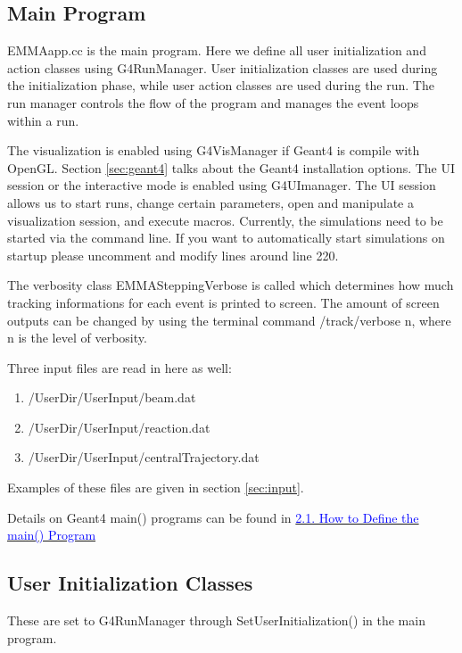 \documentclass[letter,12pt]{article}
\newcommand{\filefont}[1]{{\fontfamily{pnc}\selectfont #1}\xspace}
\newcommand{\hrefcolor}[2]{\href{#1}{\textcolor{blue}{#2}}\xspace}
\begin{document}
\subsection{Main Program}

\filefont{EMMAapp.cc} is the main program. Here we define all user initialization and action classes using \filefont{G4RunManager}. User initialization classes are used during the initialization phase, while user action classes are used during the run. The run manager controls the flow of the program and manages the event loops within a run. 

The visualization is enabled using \filefont{G4VisManager} if Geant4 is compile with OpenGL. Section \ref{sec:geant4} talks about the Geant4 installation options. The UI session or the interactive mode is enabled using \filefont{G4UImanager}. The UI session allows us to start runs, change certain parameters, open and manipulate a visualization session, and execute macros. Currently, the simulations need to be started via the command line. If you want to automatically start simulations on startup please uncomment and modify lines around line 220.

The verbosity class \filefont{EMMASteppingVerbose} is called which determines how much tracking informations for each event is printed to screen. The amount of screen outputs can be changed by using the terminal command \filefont{/track/verbose n}, where n is the level of verbosity.

Three input files are read in here as well:
\begin{enumerate}
\item \filefont{/UserDir/UserInput/beam.dat}
\item \filefont{/UserDir/UserInput/reaction.dat}
\item \filefont{/UserDir/UserInput/centralTrajectory.dat}
\end{enumerate}
Examples of these files are given in section \ref{sec:input}.

Details on Geant4 main() programs can be found in \hrefcolor{http://geant4.web.cern.ch/geant4/UserDocumentation/UsersGuides/ForApplicationDeveloper/html/ch02.html\#sect.HowToDefMain}{2.1.  How to Define the main() Program}

\subsection{User Initialization Classes}

These are set to \filefont{G4RunManager} through \filefont{SetUserInitialization()} in the main program.
\end{document}
